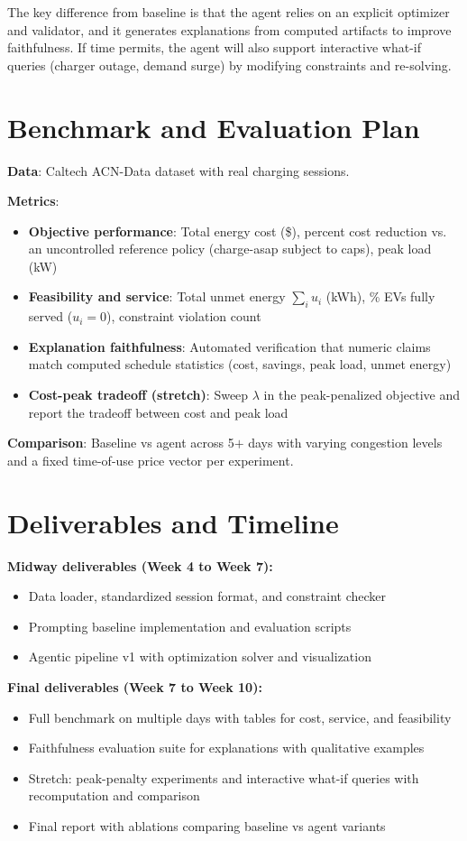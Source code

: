 \documentclass{article}
\begin{document}
The key difference from baseline is that the agent relies on an explicit optimizer and validator, and it generates explanations from computed artifacts to improve faithfulness. If time permits, the agent will also support interactive what-if queries (charger outage, demand surge) by modifying constraints and re-solving.

\section{Benchmark and Evaluation Plan}
\textbf{Data}: Caltech ACN-Data dataset \cite{acndata} with real charging sessions.

\textbf{Metrics}:
\begin{itemize}
  \item \textbf{Objective performance}: Total energy cost (\$), percent cost reduction vs. an uncontrolled reference policy (charge-asap subject to caps), peak load (kW)
  \item \textbf{Feasibility and service}: Total unmet energy $\sum_i u_i$ (kWh), \% EVs fully served ($u_i=0$), constraint violation count
  \item \textbf{Explanation faithfulness}: Automated verification that numeric claims match computed schedule statistics (cost, savings, peak load, unmet energy)
  \item \textbf{Cost-peak tradeoff (stretch)}: Sweep $\lambda$ in the peak-penalized objective and report the tradeoff between cost and peak load
\end{itemize}

\textbf{Comparison}: Baseline vs agent across 5$+$ days with varying congestion levels and a fixed time-of-use price vector per experiment.

\section{Deliverables and Timeline}
\textbf{Midway deliverables (Week 4 to Week 7):}
\begin{itemize}
  \item Data loader, standardized session format, and constraint checker
  \item Prompting baseline implementation and evaluation scripts
  \item Agentic pipeline v1 with optimization solver and visualization
\end{itemize}

\textbf{Final deliverables (Week 7 to Week 10):}
\begin{itemize}
  \item Full benchmark on multiple days with tables for cost, service, and feasibility
  \item Faithfulness evaluation suite for explanations with qualitative examples
  \item Stretch: peak-penalty experiments and interactive what-if queries with recomputation and comparison
  \item Final report with ablations comparing baseline vs agent variants
\end{itemize}



\end{document}
